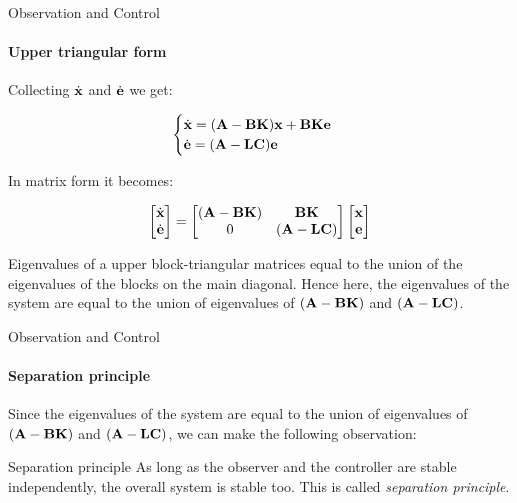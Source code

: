 \documentclass{beamer}
\begin{document}
\begin{frame}{Observation and Control}
\framesubtitle{Upper triangular form}
\begin{flushleft}

Collecting $\dot {\mathbf{x}}$ and $\dot{\mathbf{e}}$ we get:

\begin{equation}
\begin{cases}
\dot {\mathbf{x}} = (\mathbf{A}-\mathbf{B}\mathbf{K}) \mathbf{x} +  \mathbf{B}\mathbf{K}\mathbf{e} \\
\dot{\mathbf{e}} = 
(\mathbf{A}  - \mathbf{L}\mathbf{C})\mathbf{e}
\end{cases}
\end{equation}

In matrix form it becomes:

\begin{equation}
\begin{bmatrix}
\dot {\mathbf{x}} \\
\dot{\mathbf{e}}
\end{bmatrix}
=
\begin{bmatrix}
(\mathbf{A}-\mathbf{B}\mathbf{K}) & \mathbf{B}\mathbf{K} \\
0 & (\mathbf{A}  - \mathbf{L}\mathbf{C})
\end{bmatrix}
\begin{bmatrix}
\mathbf{x} \\
\mathbf{e}
\end{bmatrix}
\end{equation}

Eigenvalues of a upper block-triangular matrices equal to the union of the eigenvalues of the blocks on the main diagonal. Hence here, the eigenvalues of the system are equal to the union of eigenvalues of $(\mathbf{A}-\mathbf{B}\mathbf{K})$ and $(\mathbf{A}  - \mathbf{L}\mathbf{C})$. 

\end{flushleft}
\end{frame}



\begin{frame}{Observation and Control}
\framesubtitle{Separation principle}
\begin{flushleft}
 
Since the eigenvalues of the system are equal to the union of eigenvalues of $(\mathbf{A}-\mathbf{B}\mathbf{K})$ and $(\mathbf{A}  - \mathbf{L}\mathbf{C})$, we can make the following observation:

\bigskip

\begin{alertblock}{Separation principle}
As long as the observer and the controller are stable independently, the overall system is stable too. This is called \emph{separation principle}.
\end{alertblock}

\end{flushleft}
\end{frame}
\end{document}
